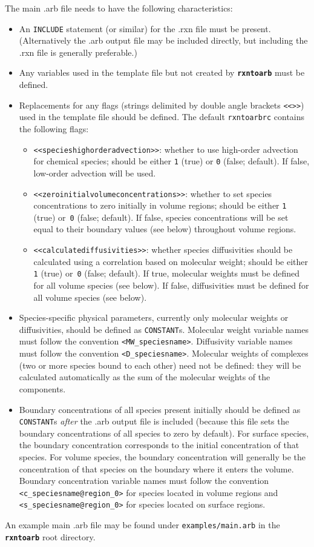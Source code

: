 \documentclass[fontsize=12pt,
               captions=abovetable,
               numbers=noenddot,
              ]{scrartcl}
\newcommand{\rxntoarb}{\texttt{\textbf{rxntoarb}}}
\begin{document}
The main .arb file needs to have the following characteristics:
\begin{itemize}
\item An \texttt{INCLUDE} statement (or similar) for the .rxn file must be present. (Alternatively the .arb output file may be included directly, but including the .rxn file is generally preferable.)
\item Any variables used in the template file but not created by \rxntoarb{} must be defined.
\item Replacements for any flags (strings delimited by double angle brackets \texttt{<<>>}) used in the template file should be defined. The default \texttt{rxntoarbrc} contains the following flags:
  \begin{itemize}
    \item \texttt{<<specieshighorderadvection>>}: whether to use high-order advection for chemical species; should be either \texttt{1} (true) or \texttt{0} (false; default). If false, low-order advection will be used.
    \item \texttt{<<zeroinitialvolumeconcentrations>>}: whether to set species concentrations to zero initially in volume regions; should be either \texttt{1} (true) or~\texttt{0} (false; default). If false, species concentrations will be set equal to their boundary values (see below) throughout volume regions.
    \item \texttt{<<calculatediffusivities>>}: whether species diffusivities should be calculated using a correlation based on molecular weight; should be either \texttt{1} (true) or~\texttt{0} (false; default). If true, molecular weights must be defined for all volume species (see below). If false, diffusivities must be defined for all volume species (see below).
  \end{itemize}
\item Species-specific physical parameters, currently only molecular weights or diffusivities, should be defined as \texttt{CONSTANT}s. Molecular weight variable names must follow the convention \texttt{<MW\_speciesname>}. Diffusivity variable names must follow the convention \texttt{<D\_speciesname>}. Molecular weights of complexes (two or more species bound to each other) need not be defined: they will be calculated automatically as the sum of the molecular weights of the components.
\item Boundary concentrations of all species present initially should be defined as \texttt{CONSTANT}s \emph{after} the .arb output file is included (because this file sets the boundary concentrations of all species to zero by default). For surface species, the boundary concentration corresponds to the initial concentration of that species. For volume species, the boundary concentration will generally be the concentration of that species on the boundary where it enters the volume. Boundary concentration variable names must follow the convention \texttt{<c\_speciesname@region\_0>} for species located in volume regions and \texttt{<s\_speciesname@region\_0>} for species located on surface regions.
\end{itemize}
An example main .arb file may be found under \texttt{examples\slash{}main.arb} in the \rxntoarb{} root directory.
\end{document}
